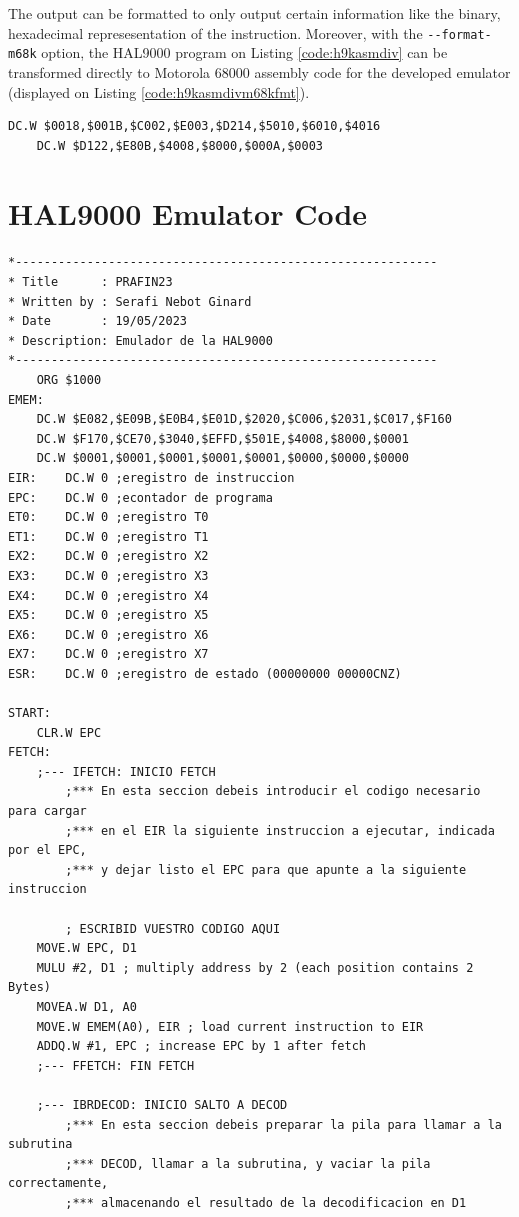 \documentclass[11pt, a4paper]{article}
\begin{document}
\begin{appendices}
	The output can be formatted to only output certain information like the binary, hexadecimal
	represesentation of the instruction. Moreover, with the \verb|--format-m68k| option, the HAL9000
	program on Listing \ref{code:h9kasmdiv} can be transformed directly to Motorola 68000 assembly
	code for the developed emulator (displayed on Listing \ref{code:h9kasmdivm68kfmt}).
	\begin{lstlisting}[style=customasm, caption={HAL9000 assmebled with M68K format}, label={code:h9kasmdivm68kfmt}]
	DC.W $0018,$001B,$C002,$E003,$D214,$5010,$6010,$4016
	DC.W $D122,$E80B,$4008,$8000,$000A,$0003
	\end{lstlisting}

	\vfill
	\pagebreak
	\section{HAL9000 Emulator Code}
	\begin{lstlisting}[style=customasm, caption={HAL9000 emulator code}, label={code:h9kemulator}]
*-----------------------------------------------------------
* Title      : PRAFIN23
* Written by : Serafi Nebot Ginard
* Date       : 19/05/2023
* Description: Emulador de la HAL9000
*-----------------------------------------------------------
	ORG $1000
EMEM:	
	DC.W $E082,$E09B,$E0B4,$E01D,$2020,$C006,$2031,$C017,$F160
	DC.W $F170,$CE70,$3040,$EFFD,$501E,$4008,$8000,$0001
	DC.W $0001,$0001,$0001,$0001,$0001,$0000,$0000,$0000
EIR:	DC.W 0 ;eregistro de instruccion
EPC:	DC.W 0 ;econtador de programa
ET0:	DC.W 0 ;eregistro T0
ET1:	DC.W 0 ;eregistro T1
EX2:	DC.W 0 ;eregistro X2
EX3:	DC.W 0 ;eregistro X3
EX4:	DC.W 0 ;eregistro X4
EX5:	DC.W 0 ;eregistro X5
EX6:	DC.W 0 ;eregistro X6
EX7:	DC.W 0 ;eregistro X7
ESR:	DC.W 0 ;eregistro de estado (00000000 00000CNZ)

START:
	CLR.W EPC
FETCH:
    ;--- IFETCH: INICIO FETCH
        ;*** En esta seccion debeis introducir el codigo necesario para cargar
        ;*** en el EIR la siguiente instruccion a ejecutar, indicada por el EPC,
	    ;*** y dejar listo el EPC para que apunte a la siguiente instruccion

		; ESCRIBID VUESTRO CODIGO AQUI
	MOVE.W EPC, D1
	MULU #2, D1 ; multiply address by 2 (each position contains 2 Bytes)
	MOVEA.W D1, A0
	MOVE.W EMEM(A0), EIR ; load current instruction to EIR
	ADDQ.W #1, EPC ; increase EPC by 1 after fetch
	;--- FFETCH: FIN FETCH

    ;--- IBRDECOD: INICIO SALTO A DECOD
        ;*** En esta seccion debeis preparar la pila para llamar a la subrutina
        ;*** DECOD, llamar a la subrutina, y vaciar la pila correctamente,
        ;*** almacenando el resultado de la decodificacion en D1


\end{lstlisting}
\end{appendices}
\end{document}
